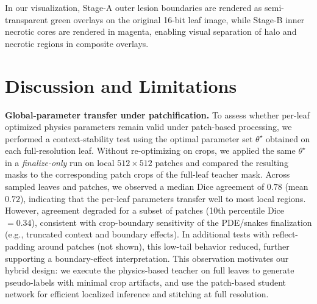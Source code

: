 \documentclass[11pt,a4paper]{article}
\begin{document}
In our visualization, Stage-A outer lesion boundaries are rendered as semi-transparent green overlays on the original 16-bit leaf image, while Stage-B inner necrotic cores are rendered in magenta, enabling visual separation of halo and necrotic regions in composite overlays.

\section{Discussion and Limitations}

\textbf{Global-parameter transfer under patchification.}
To assess whether per-leaf optimized physics parameters remain valid under patch-based processing, we performed a context-stability test using the optimal parameter set $\theta^\star$ obtained on each full-resolution leaf. Without re-optimizing on crops, we applied the same $\theta^\star$ in a \emph{finalize-only} run on local $512\times512$ patches and compared the resulting masks to the corresponding patch crops of the full-leaf teacher mask. Across sampled leaves and patches, we observed a median Dice agreement of $0.78$ (mean $0.72$), indicating that the per-leaf parameters transfer well to most local regions. However, agreement degraded for a subset of patches (10th percentile Dice $=0.34$), consistent with crop-boundary sensitivity of the PDE/snakes finalization (e.g., truncated context and boundary effects). In additional tests with reflect-padding around patches (not shown), this low-tail behavior reduced, further supporting a boundary-effect interpretation. This observation motivates our hybrid design: we execute the physics-based teacher on full leaves to generate pseudo-labels with minimal crop artifacts, and use the patch-based student network for efficient localized inference and stitching at full resolution.
\end{document}

